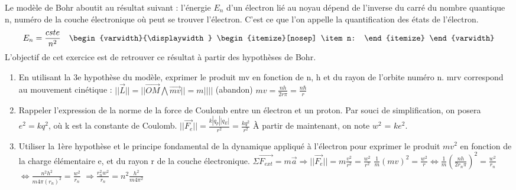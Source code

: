 \documentclass{article}
\begin{document}
Le modèle de Bohr aboutit au résultat suivant : l'énergie $E_{n}$ d'un électron lié au noyau dépend de l'inverse du carré du nombre quantique n, numéro de la couche électronique où peut se trouver l'électron. C'est ce que l'on appelle la quantification des états de l'électron.
\[
    E_{n} = \frac{cste}{n^{2}}
    \quad
    \begin{varwidth}{\displaywidth}
        \begin{itemize}[nosep]
            \item n:
        \end{itemize}
    \end{varwidth}
\]
L'objectif de cet exercice est de retrouver ce résultat à partir des hypothèses de Bohr.
\begin{enumerate}
    \item En utilisant la 3e hypothèse du modèle, exprimer le produit mv en fonction de n, h et du rayon de l'orbite numéro n.\newline
    mrv correspond au mouvement cinétique : $||\overrightarrow{L}|| = ||\overrightarrow{OM}\bigwedge\overrightarrow{mv}|| = m|||| $ (abandon)\newline
    $mv = \frac{nh}{2r\pi} = \frac{n\hbar}{r}$
    \item Rappeler l'expression de la norme de la force de Coulomb entre un électron et un proton.
    Par souci de simplification, on posera $e^{2}=kq^{2}$, où k est la constante de Coulomb.\newline
    $||\overrightarrow{F_{e}}|| = \frac{k|q_{p}||q_{E}|}{r^{2}} = \frac{kq^{2}}{r^{2}}$\newline
    À partir de maintenant, on note $w^{2}$ = $ke^{2}$.\newline
    \item Utiliser la 1ère hypothèse et le principe fondamental de la dynamique appliqué à l'électron pour exprimer le produit $mv^{2}$ en fonction de la charge élémentaire e, et du rayon r de la couche électronique.\newline
    $\Sigma \overrightarrow{F_{ext}} = m\overrightarrow{a} \Longrightarrow ||\overrightarrow{F_{e}}|| = m\frac{v^{2}}{r^{2}} = \frac{w^{2}}{r^{2}}$\newline
    $\frac{1}{m}(mv)^{2} = \frac{w^{2}}{r} \Longleftrightarrow \frac{1}{m}(\frac{nh}{2r_{n}\pi})^{2} = \frac{w^{2}}{r_{n}}$\newline
    $\Longleftrightarrow \frac{n^{2}h^{2}}{m4\pi (r_{n})^{2}} = \frac{w^{2}}{r_{n}}$\newline
    $\Longrightarrow \frac{r_{n}^{2}w^{2}}{r_{n}} = n^{2}\frac{h^{2}}{m4\pi^{2}}$\newline

\end{enumerate}
\end{document}
